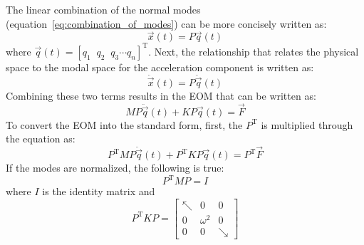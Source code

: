 \documentclass[12pt,letter]{article}
\begin{document}
The linear combination of the normal modes (equation~\ref{eq:combination_of_modes}) can be more concisely written as:
\begin{equation}
	\vec{x}(t) = P\vec{q}(t)
\end{equation}
where $\vec{q}(t) = [q_1 \; \; q_2 \; \; q_3 \cdots q_n]^{\text{T}}$. Next, the relationship that relates the physical space to the modal space for the acceleration component is written as:
\begin{equation}
	\ddot{\vec{x}}(t) = P\ddot{\vec{q}}(t)
\end{equation}
Combining these two terms results in the EOM that can be written as:
\begin{equation}
	M P\ddot{\vec{q}}(t) + KP\vec{q}(t) = \vec{F}
\end{equation}
To convert the EOM into the standard form, first, the $P^{\text{T}}$ is multiplied through the equation as:
\begin{equation}
	P^{\text{T}} M P\ddot{\vec{q}}(t) + P^{\text{T}} K P\vec{q}(t) = P^{\text{T}} \vec{F}
\end{equation}
If the modes are normalized, the following is true: 
\begin{equation}
	P^{\text{T}} M P = I
	\label{eq:modes_normalized}
\end{equation}
where $I$ is the identity matrix and 
\begin{equation}
	P^{\text{T}} K P = \begin{bmatrix} \nwarrow & 0 & 0 \\  0  & \omega^2 & 0 \\  0  & 0 & \searrow \end{bmatrix}
\end{equation}
\end{document}
